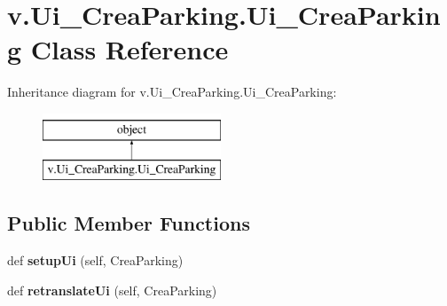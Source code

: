 \hypertarget{classv_1_1_ui___crea_parking_1_1_ui___crea_parking}{}\section{v.\+Ui\+\_\+\+Crea\+Parking.\+Ui\+\_\+\+Crea\+Parking Class Reference}
\label{classv_1_1_ui___crea_parking_1_1_ui___crea_parking}
Inheritance diagram for v.\+Ui\+\_\+\+Crea\+Parking.\+Ui\+\_\+\+Crea\+Parking\+:\begin{figure}[H]
\begin{center}
\leavevmode
\includegraphics[height=2.000000cm]{classv_1_1_ui___crea_parking_1_1_ui___crea_parking}
\end{center}
\end{figure}
\subsection*{Public Member Functions}
\begin{DoxyCompactItemize}
\item 
\hypertarget{classv_1_1_ui___crea_parking_1_1_ui___crea_parking_a67cb5596b79c0fd048cbc2224939ea6b}{}def {\bfseries setup\+Ui} (self, Crea\+Parking)\label{classv_1_1_ui___crea_parking_1_1_ui___crea_parking_a67cb5596b79c0fd048cbc2224939ea6b}

\item 
\hypertarget{classv_1_1_ui___crea_parking_1_1_ui___crea_parking_afd4c25f1aacce7609b3d415ede24c6ad}{}def {\bfseries retranslate\+Ui} (self, Crea\+Parking)\label{classv_1_1_ui___crea_parking_1_1_ui___crea_parking_afd4c25f1aacce7609b3d415ede24c6ad}

\end{DoxyCompactItemize}
